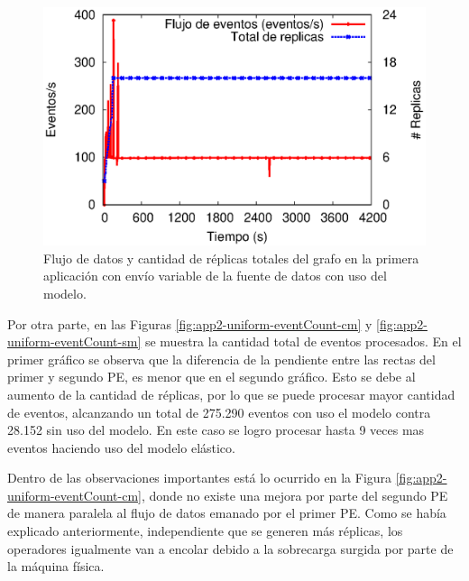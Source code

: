 \begin{figure}[!ht]
	\centering
	\includegraphics[scale=0.7]{images/exp/app2/uniform/cm/processSystem.eps}
    \caption{Flujo de datos y cantidad de r\'eplicas totales del grafo en la primera aplicaci\'on con env\'io variable de la fuente de datos con uso del modelo.}
	\label{fig:app2-uniform-processSystem-cm}
\end{figure}



Por otra parte, en las Figuras \ref{fig:app2-uniform-eventCount-cm} y \ref{fig:app2-uniform-eventCount-sm} se muestra la cantidad total de eventos procesados. En el primer gr\'afico se observa que la diferencia de la pendiente entre las rectas del primer y segundo PE, es menor que en el segundo gr\'afico. Esto se debe al aumento de la cantidad de r\'eplicas, por lo que se puede procesar mayor cantidad de eventos, alcanzando un total de 275.290 eventos con uso el modelo contra 28.152 sin uso del modelo. En este caso se logro procesar hasta 9 veces mas eventos haciendo uso del modelo el\'astico.

Dentro de las observaciones importantes est\'a lo ocurrido en la Figura \ref{fig:app2-uniform-eventCount-cm}, donde no existe una mejora por parte del segundo PE de manera paralela al flujo de datos emanado por el primer PE. Como se hab\'ia explicado anteriormente, independiente que se generen m\'as r\'eplicas, los operadores igualmente van a encolar debido a la sobrecarga surgida por parte de la m\'aquina f\'isica.

